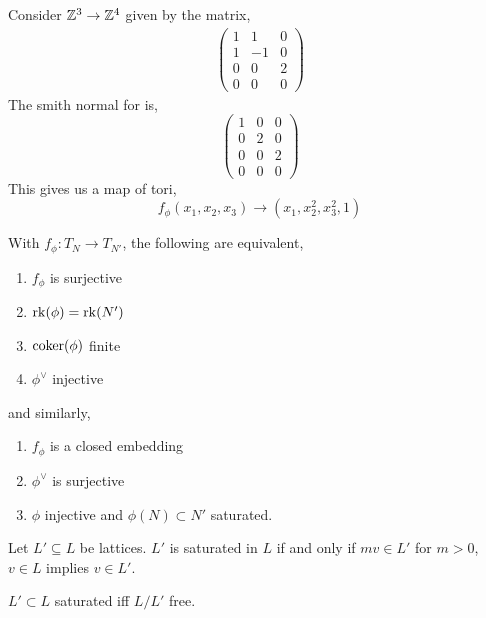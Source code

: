 \documentclass[12pt]{amsart}
\begin{document}
\begin{exercise}
    Consider $\mathbb Z^3 \to \mathbb Z^4$ given by the matrix, 
    \begin{align*}
        \begin{pmatrix}
            1 & 1 & 0 \\ 
            1 & -1 & 0 \\
            0 & 0 & 2 \\
            0 & 0 & 0
        \end{pmatrix}
    \end{align*}
    The smith normal for is, 
    \[ 
        \begin{pmatrix}
            1 & 0 & 0 \\ 
            0 & 2 & 0 \\
            0 & 0 & 2 \\
            0 & 0 & 0
        \end{pmatrix}
    \]
    This gives us a map of tori, 
    \[ f_\phi(x_1, x_2, x_3) \to (x_1, x_2^2, x_3^2, 1)\]
\end{exercise}

\begin{corollary}
    With $f_\phi: T_N \to T_{N'}$, the following are equivalent, 
    \begin{enumerate}
        \item $f_\phi$ is surjective
        \item $\operatorname{rk}(\phi) = \operatorname{rk}(N')$
        \item $\operatorname{coker}(\phi)$ finite
        \item $\phi^\vee$ injective
    \end{enumerate}
    and similarly, 
    \begin{enumerate}
        \item $f_\phi$ is a closed embedding
        \item $\phi^\vee$ is surjective
        \item $\phi$ injective and $\phi(N) \subset N'$ saturated. 
    \end{enumerate}
\end{corollary}

\begin{definition}
    Let $L' \subseteq L$ be lattices. $L'$ is saturated in $L$ if and only if $mv \in L'$ for $m > 0$, $v \in L$ implies $v \in L'$. 
\end{definition}

\begin{lemma}
    $L' \subset L$ saturated iff $L/L'$ free. 
\end{lemma}
\end{document}

